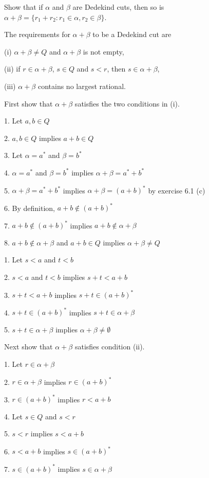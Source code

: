 
Show that if $\alpha$ and $\beta$ are Dedekind cuts, then so is
$\alpha+\beta=\{r_1+r_2:r_1\in\alpha, r_2\in\beta\}$.

\bigskip
\noindent
The requirements for $\alpha+\beta$ to be a Dedekind cut are

\medskip
\item{(i)} $\alpha+\beta\ne Q$ and $\alpha+\beta$ is not empty,
\item{(ii)} if $r\in\alpha+\beta$, $s\in Q$ and $s<r$, then $s\in\alpha+\beta$,
\item{(iii)} $\alpha+\beta$ contains no largest rational.

\medskip
\noindent
First show that $\alpha+\beta$ satisfies the two conditions in (i).

\medskip
\item{1.} Let $a,b\in Q$
\item{2.} $a,b\in Q$ implies $a+b\in Q$
\item{3.} Let $\alpha=a^*$ and $\beta=b^*$
\item{4.} $\alpha=a^*$ and $\beta=b^*$ implies $\alpha+\beta=a^*+b^*$
\item{5.} $\alpha+\beta=a^*+b^*$ implies $\alpha+\beta=(a+b)^*$ by exercise 6.1 (c)
\item{6.} By definition, $a+b\not\in(a+b)^*$
\item{7.} $a+b\not\in(a+b)^*$ implies $a+b\not\in\alpha+\beta$
\item{8.} $a+b\not\in\alpha+\beta$ and $a+b\in Q$ implies $\alpha+\beta\ne Q$

\medskip
\item{1.} Let $s<a$ and $t<b$
\item{2.} $s<a$ and $t<b$ implies $s+t<a+b$
\item{3.} $s+t<a+b$ implies $s+t\in(a+b)^*$
\item{4.} $s+t\in(a+b)^*$ implies $s+t\in\alpha+\beta$
\item{5.} $s+t\in\alpha+\beta$ implies $\alpha+\beta\ne\emptyset$

\medskip
\noindent
Next show that $\alpha+\beta$ satisfies condition (ii).

\medskip
\item{1.} Let $r\in\alpha+\beta$
\item{2.} $r\in\alpha+\beta$ implies $r\in(a+b)^*$
\item{3.} $r\in(a+b)^*$ implies $r<a+b$
\item{4.} Let $s\in Q$ and $s<r$
\item{5.} $s<r$ implies $s<a+b$
\item{6.} $s<a+b$ implies $s\in(a+b)^*$
\item{7.} $s\in(a+b)^*$ implies $s\in\alpha+\beta$

